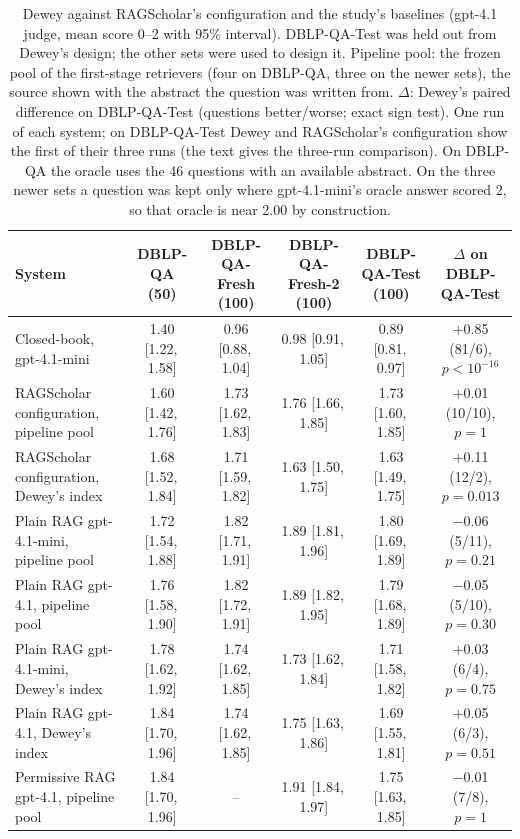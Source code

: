 \documentclass[conference]{IEEEtran}
\newcommand{\ci}[2]{{\scriptsize[#1,\,#2]}}
\newcommand{\dq}{DBLP-QA}
\newcommand{\fresh}{DBLP-QA-Fresh}
\newcommand{\freshb}{DBLP-QA-Fresh-2}
\newcommand{\test}{DBLP-QA-Test}
\begin{document}
\begin{table}[t]
\caption{Dewey against RAGScholar's configuration and the study's baselines (gpt-4.1 judge, mean score
0--2 with 95\% interval). \test{} was held out from Dewey's design; the other sets were used to design
it. Pipeline pool: the frozen pool of the first-stage retrievers (four on \dq{}, three on the newer sets),
the source shown with the abstract the question was written from. $\Delta$: Dewey's paired difference on
\test{} (questions better/worse; exact sign test). One run of each system; on \test{} Dewey and
RAGScholar's configuration show the first of their three runs (the text gives the three-run comparison).
On \dq{} the oracle uses the 46 questions with an
available abstract. On the three newer sets a question was kept only where gpt-4.1-mini's oracle answer
scored 2, so that oracle is near 2.00 by construction.}
\label{tab:dewey}
\centering\scriptsize
\setlength{\tabcolsep}{2.6pt}
\begin{tabular}{lccccc}
\toprule
System & \dq{} (50) & \fresh{} (100) & \freshb{} (100) & \test{} (100) & $\Delta$ on \test{} \\
\midrule
Closed-book, gpt-4.1-mini & 1.40 \ci{1.22}{1.58} & 0.96 \ci{0.88}{1.04} & 0.98 \ci{0.91}{1.05} & 0.89 \ci{0.81}{0.97} & $+$0.85 (81/6), $p<10^{-16}$ \\
RAGScholar configuration, pipeline pool & 1.60 \ci{1.42}{1.76} & 1.73 \ci{1.62}{1.83} & 1.76 \ci{1.66}{1.85} & 1.73 \ci{1.60}{1.85} & $+$0.01 (10/10), $p=1$ \\
RAGScholar configuration, Dewey's index & 1.68 \ci{1.52}{1.84} & 1.71 \ci{1.59}{1.82} & 1.63 \ci{1.50}{1.75} & 1.63 \ci{1.49}{1.75} & $+$0.11 (12/2), $p=0.013$ \\
Plain RAG gpt-4.1-mini, pipeline pool & 1.72 \ci{1.54}{1.88} & 1.82 \ci{1.71}{1.91} & 1.89 \ci{1.81}{1.96} & 1.80 \ci{1.69}{1.89} & $-$0.06 (5/11), $p=0.21$ \\
Plain RAG gpt-4.1, pipeline pool & 1.76 \ci{1.58}{1.90} & 1.82 \ci{1.72}{1.91} & 1.89 \ci{1.82}{1.95} & 1.79 \ci{1.68}{1.89} & $-$0.05 (5/10), $p=0.30$ \\
Plain RAG gpt-4.1-mini, Dewey's index & 1.78 \ci{1.62}{1.92} & 1.74 \ci{1.62}{1.85} & 1.73 \ci{1.62}{1.84} & 1.71 \ci{1.58}{1.82} & $+$0.03 (6/4), $p=0.75$ \\
Plain RAG gpt-4.1, Dewey's index & 1.84 \ci{1.70}{1.96} & 1.74 \ci{1.62}{1.85} & 1.75 \ci{1.63}{1.86} & 1.69 \ci{1.55}{1.81} & $+$0.05 (6/3), $p=0.51$ \\
Permissive RAG gpt-4.1, pipeline pool & 1.84 \ci{1.70}{1.96} & -- & 1.91 \ci{1.84}{1.97} & 1.75 \ci{1.63}{1.85} & $-$0.01 (7/8), $p=1$ \\

\end{tabular}
\end{table}
\end{document}
